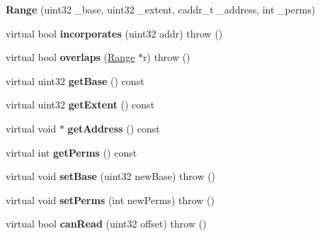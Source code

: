 \begin{DoxyCompactItemize}
\item 
\hypertarget{classRange_a714d831416094daf2f534435c36b2c8e}{
{\bfseries Range} (uint32 \_\-base, uint32 \_\-extent, caddr\_\-t \_\-address, int \_\-perms)}
\label{classRange_a714d831416094daf2f534435c36b2c8e}

\item 
\hypertarget{classRange_a5076637f68d20251b9800db6a1922ca7}{
virtual bool {\bfseries incorporates} (uint32 addr)  throw ()}
\label{classRange_a5076637f68d20251b9800db6a1922ca7}

\item 
\hypertarget{classRange_a73ad70c479cc77fcf6cb65a8da2993cb}{
virtual bool {\bfseries overlaps} (\hyperlink{classRange}{Range} $\ast$r)  throw ()}
\label{classRange_a73ad70c479cc77fcf6cb65a8da2993cb}

\item 
\hypertarget{classRange_ab4b6e3925cd4559eb8879deed47cb806}{
virtual uint32 {\bfseries getBase} () const }
\label{classRange_ab4b6e3925cd4559eb8879deed47cb806}

\item 
\hypertarget{classRange_addefe753334150b3cbaca2d5f157f17b}{
virtual uint32 {\bfseries getExtent} () const }
\label{classRange_addefe753334150b3cbaca2d5f157f17b}

\item 
\hypertarget{classRange_accb1e300390e551b7b35408413aa99b5}{
virtual void $\ast$ {\bfseries getAddress} () const }
\label{classRange_accb1e300390e551b7b35408413aa99b5}

\item 
\hypertarget{classRange_ac2cb371b9e99eacd063e422b1691204b}{
virtual int {\bfseries getPerms} () const }
\label{classRange_ac2cb371b9e99eacd063e422b1691204b}

\item 
\hypertarget{classRange_a5f60a7e0ad9e6d61d86b82163a78f776}{
virtual void {\bfseries setBase} (uint32 newBase)  throw ()}
\label{classRange_a5f60a7e0ad9e6d61d86b82163a78f776}

\item 
\hypertarget{classRange_a8228499c091dc0eae49f66877a6352c2}{
virtual void {\bfseries setPerms} (int newPerms)  throw ()}
\label{classRange_a8228499c091dc0eae49f66877a6352c2}

\item 
\hypertarget{classRange_a14cad9824900aba8bea2da530e365062}{
virtual bool {\bfseries canRead} (uint32 offset)  throw ()}
\label{classRange_a14cad9824900aba8bea2da530e365062}


\end{DoxyCompactItemize}
